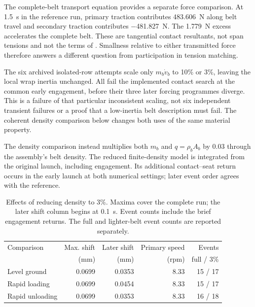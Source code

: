 \documentclass[11pt]{report}
\numberwithin{equation}{section}
\begin{document}
The complete-belt transport equation provides a separate force comparison.
At \SI{1.5}{s} in the reference run, primary traction contributes
\SI{483.606}{N} along belt travel and secondary traction contributes
\SI{-481.827}{N}. The \SI{1.779}{N} excess accelerates the complete belt.
These are tangential contact resultants, not span tensions and not the terms
of . Smallness relative to either
transmitted force therefore answers a different question from participation
in tension matching.

The six archived isolated-row attempts scale only \(m_b\dot v_b\) to
10\% or 3\%, leaving the local wrap inertia unchanged. All fail the
implemented contact search at the common early engagement, before their
three later forcing programmes diverge. This is a failure of that particular
inconsistent scaling, not six independent transient failures or a proof that
a low-inertia belt description must fail. The coherent density comparison
below changes both uses of the same material property.

The density comparison instead multiplies both \(m_b\) and
\(q=\rho_bA_b\) by 0.03 through the assembly's belt density. The reduced
finite-density model is integrated from the original launch, including
engagement. Its additional contact--seat return occurs in the early launch
at both numerical settings; later event order agrees with the reference.

\begin{table}[H]
 \centering\small
 \setlength{\tabcolsep}{4pt}\renewcommand{\arraystretch}{1.15}
 \begin{tabular}{@{}lrrrr@{}}
 \toprule
 Comparison & Max. shift & Later shift & Primary speed & Events \\
 & (\si{mm}) & (\si{mm}) & (\si{rpm}) & full / 3\% \\
 \midrule
 Level ground & 0.0699 & 0.0353 & 8.33 & 15 / 17 \\
 Rapid loading & 0.0699 & 0.0454 & 8.33 & 15 / 17 \\
 Rapid unloading & 0.0699 & 0.0353 & 8.33 & 16 / 18 \\
 \bottomrule
 \end{tabular}
 \caption{Effects of reducing density to 3\%. Maxima cover the complete
 run; the later shift column begins at \SI{0.1}{s}. Event counts include
 the brief engagement returns. The full and lighter-belt event counts are
 reported separately.}
 \label{tab:belt_density_results}
\end{table}
\end{document}
